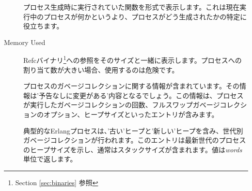 \begin{description*}
\begin{description}
			\item[] プロセス生成時に実行されていた関数を形式で表示します。これは現在実行中のプロセスが何かというより、プロセスがどう生成されたかの特定に役立ちます。
		\end{description}
	\item[Memory Used] \hfill
		\begin{description}
			\item[] Refcバイナリ\footnote{Section \ref{sec:binaries} 参照}への参照をそのサイズと一緒に表示します。プロセスへの割り当て数が大きい場合、使用するのは危険です。

			\item[] プロセスのガベージコレクションに関する情報が含まれています。その情報は'予告なしに変更がある'内容となるでしょう。この情報は、プロセスが実行したガベージコレクションの回数、フルスワップガベージコレクションのオプション、ヒープサイズといったエントリが含みます。

			\item[] 典型的なErlangプロセスは、'古い'ヒープと'新しい'ヒープを含み、世代別ガベージコレクションが行われます。このエントリは最新世代のプロセスのヒープサイズを示し、通常はスタックサイズが含まれます。値は\emph{words}単位で返します。


\end{description}
\end{description*}
